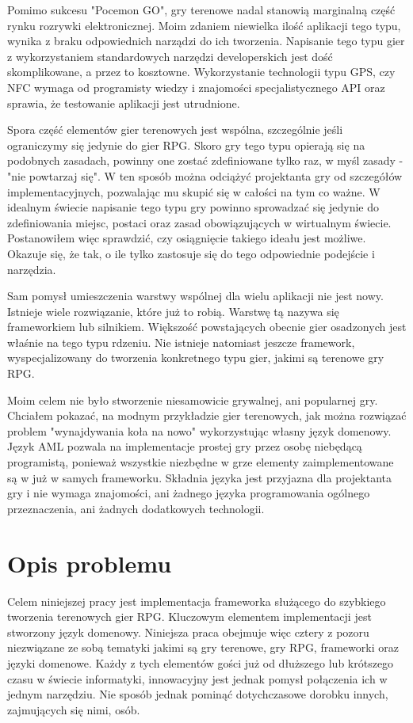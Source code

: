 \documentclass{xmgr}
\begin{document}
Pomimo sukcesu "Pocemon GO", gry terenowe nadal stanowią marginalną część rynku rozrywki elektronicznej. Moim zdaniem niewielka ilość aplikacji tego typu, wynika z braku odpowiednich narządzi do ich tworzenia. Napisanie tego typu gier z wykorzystaniem standardowych narzędzi developerskich jest dość skomplikowane, a przez to kosztowne. Wykorzystanie technologii typu GPS, czy NFC wymaga od programisty wiedzy i znajomości specjalistycznego API oraz sprawia, że testowanie aplikacji jest utrudnione.

Spora część elementów gier terenowych jest wspólna, szczególnie jeśli ograniczymy się jedynie do gier RPG. Skoro gry tego typu opierają się na podobnych zasadach, powinny one zostać zdefiniowane tylko raz, w myśl zasady - "nie powtarzaj się". W ten sposób można odciążyć projektanta gry od szczegółów implementacyjnych, pozwalając mu skupić się w całości na tym co ważne. W idealnym świecie napisanie tego typu gry powinno sprowadzać się jedynie do zdefiniowania miejsc, postaci oraz zasad obowiązujących w wirtualnym świecie. Postanowiłem więc sprawdzić, czy osiągnięcie takiego ideału jest możliwe. Okazuje się, że tak, o ile tylko zastosuje się do tego odpowiednie podejście i narzędzia.

Sam pomysł umieszczenia warstwy wspólnej dla wielu aplikacji nie jest nowy. Istnieje wiele rozwiązanie, które już to robią. Warstwę tą nazywa się frameworkiem lub silnikiem. Większość powstających obecnie gier osadzonych jest właśnie na tego typu rdzeniu. Nie istnieje natomiast jeszcze framework, wyspecjalizowany do tworzenia konkretnego typu gier, jakimi są terenowe gry RPG.

Moim celem nie było stworzenie niesamowicie grywalnej, ani popularnej gry. Chciałem pokazać, na modnym przykładzie gier terenowych, jak można rozwiązać problem "wynajdywania koła na nowo" wykorzystując własny język domenowy. Język AML pozwala na implementacje prostej gry przez osobę niebędącą programistą, ponieważ wszystkie niezbędne w grze elementy zaimplementowane są w już w samych frameworku. Składnia języka jest przyjazna dla projektanta gry i nie wymaga znajomości, ani żadnego języka programowania ogólnego przeznaczenia, ani żadnych dodatkowych technologii.

\chapter{Opis problemu}

Celem niniejszej pracy jest implementacja frameworka służącego do szybkiego tworzenia terenowych gier RPG. Kluczowym elementem implementacji jest stworzony język domenowy. Niniejsza praca obejmuje więc cztery z pozoru niezwiązane ze sobą tematyki jakimi są gry terenowe, gry RPG, frameworki oraz języki domenowe. Każdy z tych elementów gości już od dłuższego lub krótszego czasu w świecie informatyki, innowacyjny jest jednak pomysł połączenia ich w jednym narzędziu. Nie sposób jednak pominąć dotychczasowe dorobku innych, zajmujących się nimi, osób. 
\end{document}

